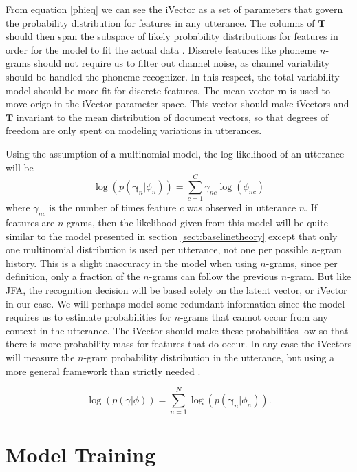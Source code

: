 From equation \ref{phieq} we can see the iVector as a set of parameters that govern the probability distribution for features in any utterance. The columns of $\mathbf{T}$ should then span the subspace of likely probability distributions for features in order for the model to fit the actual data \cite{srivector}. Discrete features like phoneme $n$-grams should not require us to filter out channel noise, as channel variability should be handled the phoneme recognizer. In this respect, the total variability model should be more fit for discrete features. The mean vector $\mathbf{m}$ is used to move origo in the iVector parameter space. This vector should make iVectors and $\mathbf{T}$ invariant to the mean distribution of document vectors, so that degrees of freedom are only spent on modeling variations in utterances.

 Using the assumption of a multinomial model, the log-likelihood of an utterance will be
\begin{equation}
\label{utterancelike}
\log(p(\mathbf{\gamma}_n | \phi_n)) = \sum_{c=1}^C \gamma_{nc} \log(\phi_{nc})
\end{equation}
where $\gamma_{nc}$ is the number of times feature $c$ was observed in utterance $n$. If features are $n$-grams, then the likelihood given from this model will be quite similar to the model presented in section \ref{sect:baselinetheory} except that only one multinomial distribution is used per utterance, not one per possible $n$-gram history. This is a slight inaccuracy in the model when using $n$-grams, since per definition, only a fraction of the $n$-grams can follow the previous $n$-gram. But like JFA, the recognition decision will be based solely on the latent vector, or iVector in our case. We will perhaps model some redundant information since the model requires us to estimate probabilities for $n$-grams that cannot occur from any context in the utterance. The iVector should make these probabilities low so that there is more probability mass for features that do occur. In any case the iVectors will measure the $n$-gram probability distribution in the utterance, but using a more general framework than strictly needed \cite{lrivector}.

\begin{equation}
\label{iloglike}
\log(p(\gamma | \phi)) = \sum_{n=1}^N \log(p(\mathbf{\gamma}_n | \phi_n)).
\end{equation}

\section{Model Training}
\label{sect:ivecttrain}

